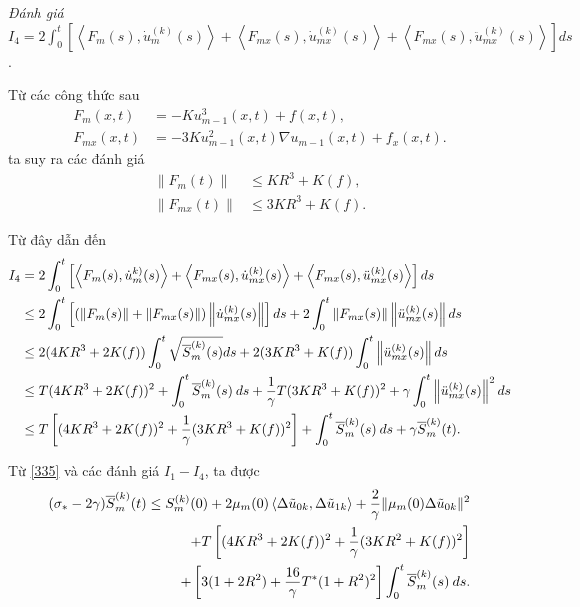 \documentclass[12pt,a4paper]{article}
\theoremstyle{definition}
\theoremstyle{definition}
\begin{document}
\textit{Đánh giá} $\displaystyle I_4 = 2 \int_0^t \left[\left<F_m(s), \dot{u}_m^{(k)}(s)\right> + \left< F_{mx}(s), \dot{u}_{mx}^{(k)}(s)\right> + \left<F_{mx}(s), \ddot{u}_{mx}^{(k)}(s)\right>\right] ds$.

Từ các công thức sau
\begin{align*}
    F_m(x,t) &= -K u^3_{m-1}(x,t) + f(x,t), \\
    F_{mx}(x,t) &= -3K u^2_{m-1}(x,t) \nabla u_{m-1}(x,t) + f_x(x,t).
\end{align*}
ta suy ra các đánh giá
\begin{align*}
    \|F_m(t)\| &\le KR^3 + K(f), \\
    \|F_{mx}(t)\| &\le 3KR^3 + K(f).
\end{align*}

Từ đây dẫn đến
\begin{align}
    I_4
    &= 2 \int_0^t \left[\left<F_m(s), \dot{u}_m^{k)}(s)\right> + \left< F_{mx}(s), \dot{u}_{mx}^{(k)}(s)\right> + \left<F_{mx}(s), \ddot{u}_{mx}^{(k)}(s)\right>\right] ds \\
    &\le 2 \int_0^t \left[(\|F_m(s)\| + \|F_{mx}(s)\|) \left\|\dot{u}_{mx}^{(k)}(s)\right\|\right] ds
     + 2 \int_0^t \|F_{mx}(s)\| \left\|\ddot{u}_{mx}^{(k)}(s)\right\| ds \notag \\
    &\le 2(4KR^3 + 2K(f)) \int_0^t \sqrt{\overline{S}_m^{(k)}(s)} ds + 2(3KR^3 + K(f)) \int_0^t \left\|\ddot{u}_{mx}^{(k)}(s)\right\| ds \notag \\
    &\le T(4KR^3 + 2K(f))^2 + \int_0^t \overline{S}_m^{(k)}(s) \: ds + \frac{1}{\gamma} T (3KR^3 + K(f))^2 + \gamma \int_0^t \left\|\ddot{u}_{mx}^{(k)}(s)\right\|^2 ds \notag \\
    &\le T\left[(4KR^3 + 2K(f))^2 + \frac{1}{\gamma}(3KR^3 + K(f))^2\right] + \int_0^t \overline{S}_m^{(k)}(s) \: ds + \gamma \overline{S}_m^{(k)}(t). \notag
\end{align}

Từ \eqref{335} và các đánh giá $I_1 - I_4$, ta được
\begin{align} \label{340}
    (\sigma_* - 2\gamma) \overline{S}_m^{(k)}(t)
    \le S_m^{(k)}(0) + 2 \mu_m(0) \left<\Delta \tilde{u}_{0k}, \Delta \tilde{u}_{1k}\right>
    + \frac{2}{\gamma} \| \mu_m(0) \Delta \tilde{u}_{0k} \|^2 \\
    + T \left[(4KR^3 + 2K(f))^2 + \frac{1}{\gamma}(3KR^2 + K(f))^2\right] \notag \\
    + \left[3(1+2R^2) + \frac{16}{\gamma}T^* (1+R^2)^2\right] \int_0^t \overline{S}_m^{(k)}(s)\:ds. \notag
\end{align}
\end{document}
